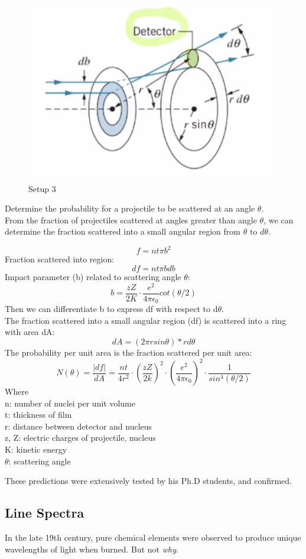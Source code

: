 \documentclass[class=article,crop=false]{standalone}
\begin{document}
\lecture


\begin{figure}[h!]
	\centering
	\includegraphics[width=.4\linewidth]{./Images/rdetector.png}
	\caption{Setup 3}
\end{figure}
\begin{result}
	Determine the probability for a projectile to be scattered at an angle $\theta$. \\
	From the fraction of projectiles scattered at angles greater than angle $\theta$, we can determine the fraction scattered into a small angular region from $\theta$ to $d\theta$.
	
	$$ f = nt\pi b^2 $$
	Fraction scattered into region:
	$$ df = nt\pi b db $$
	Impact parameter (b) related to scattering angle $\theta$:
	$$ b = \frac{zZ}{2K} \cdot \frac{e^2}{4\pi \epsilon_0} cot(\theta/2) $$
	Then we can differentiate b to express df with respect to d$\theta$.\\
	The fraction scattered into a small angular region (df) is scattered into a ring with area dA:
	$$ dA = (2\pi r sin\theta)*rd\theta $$
	The probability per unit area is the fraction scattered per unit area:
	$$ N(\theta) = \frac{|df|}{dA} = \frac{nt}{4r^2} \cdot (\frac{zZ}{2k})^2 \cdot (\frac{e^2}{4\pi \epsilon_0})^2 \cdot \frac{1}{sin^4(\theta/2)} $$
	Where\\
	n: number of nuclei per unit volume\\
	t: thickness of film\\
	r: distance between detector and nucleus\\
	z, Z: electric charges of projectile, nucleus\\
	K: kinetic energy\\
	$\theta$: scattering angle
\end{result}
These predictions were extensively tested by his Ph.D students, and confirmed.

\subsection{Line Spectra}
In the late 19th century, pure chemical elements were observed to produce unique wavelengths of light when burned. But not \emph{why}.
\end{document}
